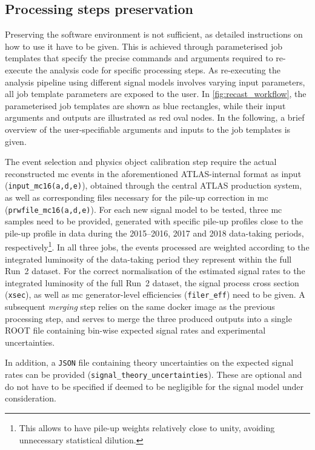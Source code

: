 \subsection{Processing steps preservation}

Preserving the software environment is not sufficient, as detailed instructions on how to use it have to be given. This is achieved through parameterised job templates that specify the precise commands and arguments required to re-execute the analysis code for specific processing steps. As re-executing the analysis pipeline using different signal models involves varying input parameters, all job template parameters are exposed to the user. In \cref{fig:recast_workflow}, the parameterised job templates are shown as blue rectangles, while their input arguments and outputs are illustrated as red oval nodes. In the following, a brief overview of the user-specifiable arguments and inputs to the job templates is given. 

The event selection and physics object calibration step require the actual reconstructed \gls{mc} events in the aforementioned ATLAS-internal format as input (\texttt{input\_mc16(a,d,e)}), obtained through the central ATLAS production system, as well as corresponding files necessary for the pile-up correction in \gls{mc} (\texttt{prwfile\_mc16(a,d,e)}). 
For each new signal model to be tested, three \gls{mc} samples need to be provided, generated with specific pile-up profiles close to the pile-up profile in data during the 2015--2016, 2017 and 2018 data-taking periods, respectively\footnote{This allows to have pile-up weights relatively close to unity, avoiding unnecessary statistical dilution.}. 
In all three jobs, the events processed are weighted according to the integrated luminosity of the data-taking period they represent within the full Run~2 dataset.
For the correct normalisation of the estimated signal rates to the integrated luminosity of the full Run~2 dataset, the signal process cross section (\texttt{xsec}), as well as \gls{mc} generator-level efficiencies (\texttt{filer\_eff}) need to be given. 
A subsequent \textit{merging} step relies on the same docker image as the previous processing step, and serves to merge the three produced outputs into a single \textsc{ROOT} file containing bin-wise expected signal rates and experimental uncertainties.

In addition, a \texttt{JSON} file containing theory uncertainties on the expected signal rates can be provided (\texttt{signal\_theory\_uncertainties}). These are optional and do not have to be specified if deemed to be negligible for the signal model under consideration.


